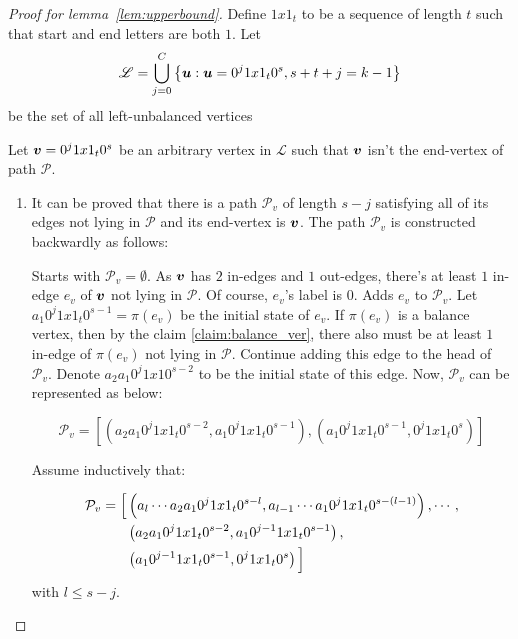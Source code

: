 \begin{proof}[Proof for lemma~\ref{lem:upperbound}]
    Define $1x1_{t}$ to be a sequence of length $t$ such that start and end letters are both $1$. Let $$\mathscr{L}=\bigcup_{j=0}^{C}\left\{{\boldsymbol u}:{\boldsymbol u}=0^{j}1x1_{t}0^{s},s+t+j=k-1\right\}$$ be the set of all left-unbalanced vertices
    
    Let ${\boldsymbol v}=0^{j}1x1_{t}0^{s}$ be an arbitrary vertex in $\mathscr{L}$ such that ${\boldsymbol v}$ isn't the end-vertex of path $\mathscr{P}$. 
    
    \begin{enumerate}
        \item It can be proved that there is a path $\mathcal{P}_{v}$ of length $s-j$ satisfying all of its edges not lying in $\mathscr{P}$ and its end-vertex is ${\boldsymbol v}$.
            The path $\mathcal{P}_{v}$ is constructed backwardly as follows:
            
            Starts with $\mathcal{P}_{v}=\emptyset$. As ${\boldsymbol v}$ has $2$ in-edges and $1$ out-edges, there's at least $1$ in-edge $e_{v}$ of ${\boldsymbol v}$ not lying in $\mathscr{P}$. Of course, $e_{v}$'s label is $0$. Adds $e_{v}$ to $\mathscr{P}_{v}$. Let $a_{1}0^{j}1x1_{t}0^{s-1}= \pi(e_{v})$ be the initial state of $e_{v}$. If $\pi(e_{v})$ is a balance vertex, then by the claim \ref{claim:balance_ver}, there also must be at least $1$ in-edge of $\pi(e_{v})$ not lying in $\mathscr{P}$. Continue adding this edge to the head of $\mathcal{P}_{v}$. Denote $a_{2}a_{1}0^{j}1x10^{s-2}$ to be the initial state of this edge. Now, $\mathcal{P}_{v}$ can be represented as below:
            
            \[\mathcal{P}_{v}=\left[\left(a_{2}a_{1}0^{j}1x1_{t}0^{s-2},a_{1}0^{j}1x1_{t}0^{s-1}\right), \left(a_{1}0^{j}1x1_{t}0^{s-1},0^{j}1x1_{t}0^{s}\right)\right]\]
            
            Assume inductively that:
            
            \begin{align*}
                \mathcal{P}_{v}= \Bigl[&\left(a_{l}\cdots a_{2}a_{1}0^{j}1x1_{t}0^{s-l},a_{l-1}\cdots a_{1}0^{j}1x1_{t}0^{s-(l-1)}\right),\cdots,\\
                &\left(a_{2}a_{1}0^{j}1x1_{t}0^{s-2}, a_{1}0^{j-1}1x1_{t}0^{s-1}\right),\\
                &\left(a_{1}0^{j-1}1x1_{t}0^{s-1},0^{j}1x1_{t}0^{s}\right)\Bigl]   
            \end{align*}
            with $l\leq s-j$.
            

\end{enumerate}
\end{proof}
